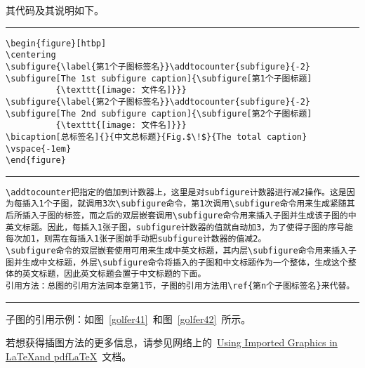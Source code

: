 其代码及其说明如下。
\vspace{1em}\noindent\hrule
\begin{verbatim}
\begin{figure}[htbp]
\centering
\subfigure{\label{第1个子图标签名}}\addtocounter{subfigure}{-2}
\subfigure[The 1st subfigure caption]{\subfigure[第1个子图标题]
          {\texttt{[image: 文件名]}}}
\subfigure{\label{第2个子图标签名}}\addtocounter{subfigure}{-2}
\subfigure[The 2nd subfigure caption]{\subfigure[第2个子图标题]
          {\texttt{[image: 文件名]}}}
\bicaption[总标签名]{}{中文总标题}{Fig.$\!$}{The total caption}
\vspace{-1em}
\end{figure}
\end{verbatim}
\noindent\hrule
\begin{verbatim}
\addtocounter把指定的值加到计数器上，这里是对subfigure计数器进行减2操作。这是因为每插入1个子图，就调用3次\subfigure命令，第1次调用\subfigure命令用来生成紧随其后所插入子图的标签，而之后的双层嵌套调用\subfigure命令用来插入子图并生成该子图的中英文标题。因此，每插入1张子图，subfigure计数器的值就自动加3，为了使得子图的序号能每次加1，则需在每插入1张子图前手动把subfigure计数器的值减2。
\subfigure命令的双层嵌套使用可用来生成中英文标题，其内层\subfigure命令用来插入子图并生成中文标题，外层\subfigure命令将插入的子图和中文标题作为一个整体，生成这个整体的英文标题，因此英文标题会置于中文标题的下面。
引用方法：总图的引用方法同本章第1节，子图的引用方法用\ref{第n个子图标签名}来代替。
\end{verbatim}
\noindent\hrule\vspace{1em}

子图的引用示例：如图~\ref{golfer41}~和图~\ref{golfer42}~所示。

若想获得插图方法的更多信息，请参见网络上的~\href{ftp://ftp.tex.ac.uk/tex-archive/info/epslatex.pdf}{Using Imported Graphics in \LaTeX and pdf\LaTeX}~文档。 